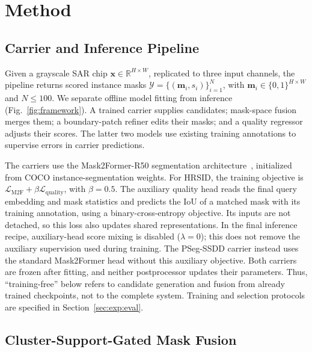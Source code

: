 \section{Method}\label{sec:method}

\subsection{Carrier and Inference Pipeline}\label{sec:overview}

Given a grayscale SAR chip $\mathbf{x}\in\mathbb{R}^{H\times W}$, replicated to three input channels, the pipeline returns scored instance masks $\mathcal{Y}=\{(\mathbf{m}_i,s_i)\}_{i=1}^{N}$, with $\mathbf{m}_i\in\{0,1\}^{H\times W}$ and $N\le100$. We separate offline model fitting from inference (Fig.~\ref{fig:framework}). A trained carrier supplies candidates; mask-space fusion merges them; a boundary-patch refiner edits their masks; and a quality regressor adjusts their scores. The latter two models use existing training annotations to supervise errors in carrier predictions.

The carriers use the Mask2Former-R50 segmentation architecture~\cite{mask2former2022}, initialized from COCO instance-segmentation weights. For HRSID, the training objective is $\mathcal{L}_{\mathrm{M2F}}+\beta\mathcal{L}_{\mathrm{quality}}$, with $\beta=0.5$. The auxiliary quality head reads the final query embedding and mask statistics and predicts the IoU of a matched mask with its training annotation, using a binary-cross-entropy objective. Its inputs are not detached, so this loss also updates shared representations. In the final inference recipe, auxiliary-head score mixing is disabled ($\lambda=0$); this does not remove the auxiliary supervision used during training. The PSeg-SSDD carrier instead uses the standard Mask2Former head without this auxiliary objective. Both carriers are frozen after fitting, and neither postprocessor updates their parameters. Thus, ``training-free'' below refers to candidate generation and fusion from already trained checkpoints, not to the complete system. Training and selection protocols are specified in Section~\ref{sec:exp:eval}.


\subsection{Cluster-Support-Gated Mask Fusion}\label{sec:fusion}

